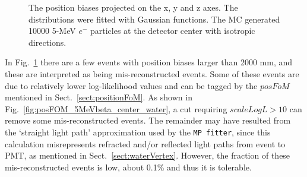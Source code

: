 \begin{figure}[htbp]
{\begin{minipage}[b]{0.4\textwidth}
		\end{minipage}
	}
	\caption[The position biases projected on the x, y and z axes.]{The position biases projected on the x, y and z axes. The distributions were fitted with Gaussian functions. The MC generated 10000 5-MeV $e^-$ particles at the detector center with isotropic directions.\label{fig:5MeVbeta_center_water}}
\end{figure}

In Fig.~\ref{fig:5MeVbeta_center_water} there are a few events with position biases larger than 2000 mm, and these are interpreted as being mis-reconstructed events. Some of these events are due to relatively lower log-likelihood values and can be tagged by the $posFoM$ mentioned in Sect.~\ref{sect:positionFoM}. As shown in Fig.~\ref{fig:posFOM_5MeVbeta_center_water}, a cut requiring $scaleLogL>10$ can remove some mis-reconstructed events. The remainder may have resulted from the `straight light path' approximation used by the \texttt{MP fitter}, since this calculation misrepresents refracted and/or reflected light paths from event to PMT, as mentioned in Sect.~\ref{sect:waterVertex}. However, the fraction of these mis-reconstructed events is low, about 0.1\% and thus it is tolerable.

